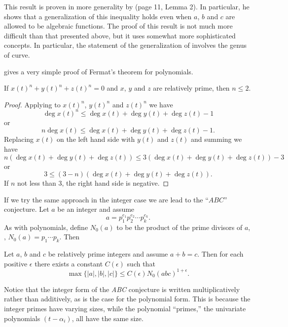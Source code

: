 This result is proven in more generality by {\Mason}
\cite{Mason:1984} (page 11, Lemma 2).  In particular, he shows that a
generalization of this inequality holds even when $a$, $b$ and $c$ are
allowed to be algebraic functions.  The proof of this result is not
much more difficult than that presented above, but it uses somewhat
more sophisticated concepts. In particular, the statement of the
generalization of  involves the genus of
curve.

 gives a very simple proof of Fermat's theorem for
polynomials.

\begin{proposition}\label{Poly:FLT:Prop}
If $x(t)^n + y(t)^n + z(t)^n = 0$ and $x$, $y$ and $z$ are relatively
prime, then $n \le 2$.
\end{proposition}

\begin{proof}
Applying  to $x(t)^n$, $y(t)^n$ and $z(t)^n$
we have
\[
\deg x(t)^n \le \deg x(t) + \deg y(t) + \deg z(t) - 1
\]
or
\[
n \deg x(t) \le \deg x(t) + \deg y(t) + \deg z(t) - 1.
\]
Replacing $x(t)$ on the left hand side with $y(t)$ and $z(t)$ and
summing we have
\[
n (\deg x(t) + \deg y(t) + \deg z(t)) 
   \le 3 (\deg x(t) + \deg y(t) + \deg z(t)) - 3
\]
or
\[
3 \le (3 - n) (\deg x(t) + \deg y(t) + \deg z(t)).
\]
If $n$ not less than $3$, the right hand side is negative.
\end{proof}

\medskip
If we try the same approach in the integer case we are lead to the
``$ABC$'' conjecture.  Let $a$ be an integer and assume
\[
a = p_1^{e_1} p_2^{e_2} \cdots p_k^{e_k}.
\]
As with polynomials, define $N_0(a)$ to be the product of the prime
divisors of $a$, \ie, $N_0(a) = p_1 \cdots p_k$.  Then

\def\ABCconj{{\em ABC} conjecture\index{ABC conjecture@{\em ABC} conjecture}}
\begin{conjecture}[ABC] \label{ABC:Conj}
Let $a$, $b$ and $c$ be relatively prime integers and assume $a+b =
c$.  Then for each positive $\epsilon$ there exists a constant
$C(\epsilon)$ such that
\[
\max\{|a|, |b|, |c| \} \le C(\epsilon) N_0(abc)^{1+\epsilon}.
\]
\end{conjecture}

Notice that the integer form of the {\ABCconj} is written
multiplicatively rather than additively, as is the case for the
polynomial form.  This is because the integer primes have varying
sizes, while the polynomial ``primes,'' the univariate polynomials $(t
- \alpha_i)$, all have the same size.

